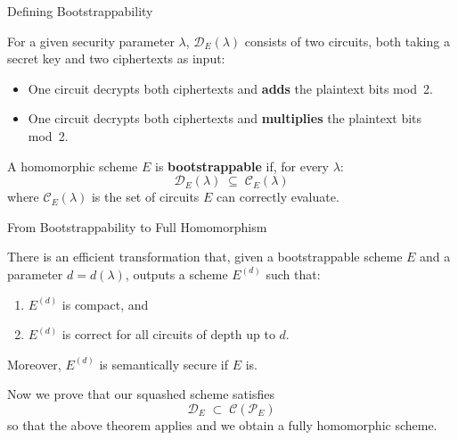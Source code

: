 \documentclass[10pt]{beamer}
\begin{document}
\begin{frame}{Defining Bootstrappability}
    \begin{definition}
    For a given security parameter $\lambda$, $\mathcal{D}_E(\lambda)$
    consists of two circuits, both taking a secret key and two ciphertexts
    as input:    
    \begin{itemize}
        \item One circuit decrypts both ciphertexts and \textbf{adds} the
              plaintext bits mod~2.
        \item One circuit decrypts both ciphertexts and \textbf{multiplies}
              the plaintext bits mod~2.
    \end{itemize}
    \end{definition}

    \vspace{0.3cm}
    \begin{definition}
    A homomorphic scheme $E$ is \textbf{bootstrappable} if, for every $\lambda$:
    \[
        \mathcal{D}_E(\lambda) \;\subseteq\; \mathcal{C}_E(\lambda)
    \]
    where $\mathcal{C}_E(\lambda)$ is the set of circuits $E$ can correctly
    evaluate.
    \end{definition}
\end{frame}

\begin{frame}{From Bootstrappability to Full Homomorphism}
    \begin{theorem}[Gentry 2009]
    There is an efficient transformation that, given a bootstrappable scheme
    $E$ and a parameter $d = d(\lambda)$, outputs a scheme $E^{(d)}$ such
    that:
    \begin{enumerate}
        \item $E^{(d)}$ is compact, and
        \item $E^{(d)}$ is correct for all circuits of depth up to $d$.
    \end{enumerate}
    Moreover, $E^{(d)}$ is semantically secure if $E$ is.
    \end{theorem}

    \vspace{0.4cm}

    Now we prove that our squashed scheme satisfies
    \[
        \mathcal{D}_E \;\subset\; \mathcal{C}(\mathcal{P}_E)
    \]
    so that the above theorem applies and we obtain a fully homomorphic scheme.
\end{frame}
\end{document}

